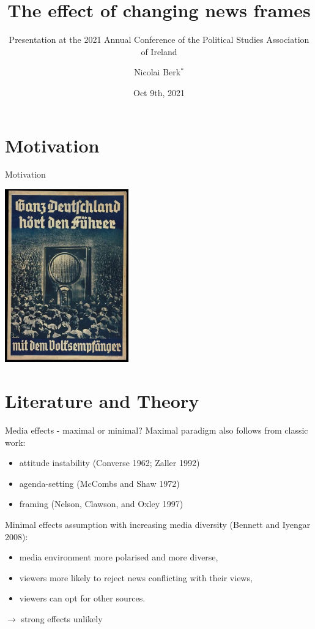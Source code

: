 \documentclass[
  ignorenonframetext,
]{beamer}
\title{The effect of changing news frames}
\subtitle{Presentation at the 2021 Annual Conference of the Political
Studies Association of Ireland}
\author{Nicolai Berk\(^*\)}
\date{Oct 9th, 2021}
\institute{\(^*\)RTG Dynamics/Humboldt Universität zu Berlin}
\providecommand{\tightlist}{%
  \setlength{\itemsep}{0pt}\setlength{\parskip}{0pt}}
\begin{document}
\frame{\titlepage}

\hypertarget{motivation}{%
\section{Motivation}\label{motivation}}

\begin{frame}{Motivation}
\center

\includegraphics[width=0.4\textwidth,height=\textheight]{vis/volksempfanger.jpg}
\end{frame}

\hypertarget{literature-and-theory}{%
\section{Literature and Theory}\label{literature-and-theory}}

\begin{frame}[allowframebreaks]{Media effects - maximal or minimal?}
\protect\hypertarget{media-effects---maximal-or-minimal}{}
Maximal paradigm also follows from classic work:

\begin{itemize}
\tightlist
\item
  attitude instability (Converse 1962; Zaller 1992)
\item
  agenda-setting (McCombs and Shaw 1972)
\item
  framing (Nelson, Clawson, and Oxley 1997)
\end{itemize}

\framebreak

Minimal effects assumption with increasing media diversity (Bennett and
Iyengar 2008):

\begin{itemize}
\tightlist
\item
  media environment more polarised and more diverse,
\item
  viewers more likely to reject news conflicting with their views,
\item
  viewers can opt for other sources.
\end{itemize}

\(\rightarrow\) strong effects unlikely
\end{frame}
\end{document}
